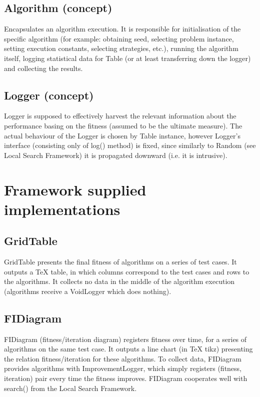\subsection{Algorithm (concept)}

Encapsulates an algorithm execution. It is responsible for
initialisation of the specific algorithm (for example: obtaining seed, 
selecting problem instance, setting execution constants, selecting strategies,
etc.), running the algorithm itself, logging statistical data for Table
(or at least transferring down the logger) and collecting the results.

\subsection{Logger (concept)}

Logger is supposed to effectively harvest the relevant information
about the performance basing on the fitness (assumed to be the ultimate measure).
The actual behaviour of the Logger is chosen by Table instance, however
Logger's interface (consisting only of log() method) is fixed,
since similarly to Random (see Local Search Framework) it is propagated downward
(i.e. it is intrusive).

\section{Framework supplied implementations}

\subsection{GridTable}

GridTable presents the final fitness of algorithms on a series of test cases.
It outputs a TeX table, in which columns correspond to the test cases and
rows to the algorithms. It collects no data in the middle of the algorithm
execution (algorithms receive a VoidLogger which does nothing).

\subsection{FIDiagram}

FIDiagram (fitness/iteration diagram) registers fitness over time,
for a series of algorithms on the same test case.
It outputs a line chart (in TeX tikz) presenting the relation fitness/iteration
for these algorithms. To collect data, FIDiagram provides algorithms with
ImprovementLogger, which simply registers (fitness, iteration) pair every time the fitness
improves. FIDiagram cooperates well with search() from the Local Search Framework.

